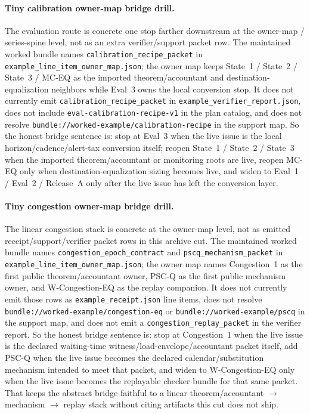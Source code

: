 \documentclass[11pt]{article}
\begin{document}
\paragraph{Tiny calibration owner-map bridge drill.}
The evaluation route is concrete one stop farther downstream at the owner-map / series-spine level, not as an extra verifier/support packet row. The maintained worked bundle names \nolinkurl{calibration\_recipe\_packet} in \nolinkurl{example\_line\_item\_owner\_map.json}; the owner map keeps State~1 / State~2 / State~3 / MC-EQ as the imported theorem/accountant and destination-equalization neighbors while Eval~3 owns the local conversion stop. It does not currently emit \nolinkurl{calibration\_recipe\_packet} in \nolinkurl{example\_verifier\_report.json}, does not include \nolinkurl{eval-calibration-recipe-v1} in the plan catalog, and does not resolve \nolinkurl{bundle://worked-example/calibration-recipe} in the support map. So the honest bridge sentence is: stop at Eval~3 when the live issue is the local horizon/cadence/alert-tax conversion itself; reopen State~1 / State~2 / State~3 when the imported theorem/accountant or monitoring roots are live, reopen MC-EQ only when destination-equalization sizing becomes live, and widen to Eval~1 / Eval~2 / Release~A only after the live issue has left the conversion layer.\cite{state1,state2,state3,series:mceq,series:eval3,series:evalnotary,series:advantagecontracts,series:releaseproperty,series:workedexample}

\paragraph{Tiny congestion owner-map bridge drill.}
The linear congestion stack is concrete at the owner-map level, not as emitted receipt/support/verifier packet rows in this archive cut. The maintained worked bundle names \nolinkurl{congestion\_epoch\_contract} and \nolinkurl{pscq\_mechanism\_packet} in \nolinkurl{example\_line\_item\_owner\_map.json}; the owner map names Congestion~1 as the first public theorem/accountant owner, PSC-Q as the first public mechanism owner, and W-Congestion-EQ as the replay companion. It does not currently emit those rows as \nolinkurl{example\_receipt.json} line items, does not resolve \nolinkurl{bundle://worked-example/congestion-eq} or \nolinkurl{bundle://worked-example/pscq} in the support map, and does not emit a \nolinkurl{congestion\_replay\_packet} in the verifier report. So the honest bridge sentence is: stop at Congestion~1 when the live issue is the declared waiting-time witness/load-envelope/accountant packet itself, add PSC-Q when the live issue becomes the declared calendar/substitution mechanism intended to meet that packet, and widen to W-Congestion-EQ only when the live issue becomes the replayable checker bundle for that same packet. That keeps the abstract bridge faithful to a linear theorem/accountant $\to$ mechanism $\to$ replay stack without citing artifacts this cut does not ship.\cite{series:congestion1,series:pscq,series:wcongestion,series:workedexample}
\end{document}
